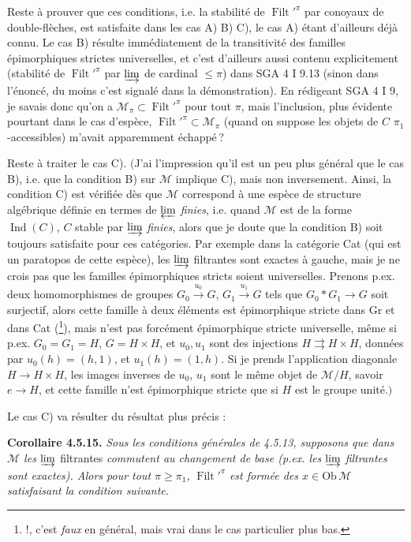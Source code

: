 \documentclass[11pt]{article}
\newcommand{\msp}[1]{\marginpar{\footnotesize [#1]}}
\newcommand{\Ob}{\mathrm{Ob}\,}
\newcommand{\Filt}{\operatorname{Filt}}
\newcommand{\Ind}{\operatorname{Ind}}
\begin{document}
Reste à prouver que ces conditions, i.e. la stabilité de $\Filt'^{\pi}$ par conoyaux de double-flèches, est satisfaite dans les cas A) B) C), le cas A) étant d'ailleurs déjà connu. Le cas B) résulte immédiatement de la transitivité des familles épimorphiques strictes universelles, et c'est d'ailleurs aussi contenu explicitement (stabilité de $\Filt'^{\pi}$ par $\varinjlim$ de cardinal $\leqslant \pi$) dans SGA 4 I 9.13 (sinon dans l'énoncé, du moins c'est signalé dans la démonstration). En rédigeant SGA 4 I 9, je savais donc qu'on a $\mathcal{M}_{\pi} \subset \Filt'^{\pi}$ pour tout $\pi$, mais l'inclusion, plus évidente pourtant dans le cas d'espèce, $\Filt'^{\pi} \subset \mathcal{M}_{\pi}$ (quand on suppose les objets de $C$ $\pi_1$-accessibles) m'avait apparemment échappé\,?

Reste à traiter le cas C). $\Big($J'ai l'impression qu'il est un peu plus général que le cas B), i.e. que la condition B) sur $\mathcal{M}$ implique C), mais non inversement. Ainsi, la condition C) est vérifiée dès que $\mathcal{M}$ correspond à une espèce de structure algébrique définie en
\msp{page 135}
termes de $\varprojlim$ \textit{finies}, i.e. quand $\mathcal{M}$ est de la forme $\Ind(C)$, $C$ stable par $\varinjlim$ \textit{finies}, alors que je doute que la condition B) soit toujours satisfaite pour ces catégories. Par exemple dans la catégorie Cat (qui est un paratopos de cette espèce), les $\varinjlim$ filtrantes sont exactes à gauche, mais je ne crois pas que les familles épimorphiques stricts soient universelles. %
Prenons p.ex. deux homomorphismes de groupes $G_0 \xrightarrow{u_0} G$, $G_1 \xrightarrow{u_1} G$ tels que $G_0 * G_1 \longrightarrow G$ soit surjectif, alors cette famille à deux éléments est épimorphique stricte dans Gr et dans Cat (\footnote{!, c'est \textit{faux} en général, mais vrai dans le cas particulier plus bas.}), mais n'est pas forcément épimorphique stricte universelle, même si p.ex. $G_0 = G_1 = H$, $G = H \times H$, et $u_0, u_1$ sont des injections $H \rightrightarrows H \times H$, données par $u_0(h) = (h,1)$, et $u_1(h) = (1,h)$. Si je prends l'application diagonale $H \longrightarrow H \times H$, les images inverses de $u_0$, $u_1$ sont le même objet de $\mathcal{M}/H$, savoir $e \longrightarrow H$, et cette famille n'est épimorphique stricte que si $H$ est le groupe unité.$\Big)$

Le cas C) va résulter du résultat plus précis :

\textbf{Corollaire 4.5.15.} \textit{Sous les conditions générales de 4.5.13, supposons que dans $\mathcal{M}$ les} $\varinjlim$
\msp{page 136}
filtrantes \textit{commutent au changement de base (p.ex. les} $\varinjlim$ \textit{filtrantes sont exactes). Alors pour tout $\pi \geqslant \pi_1$,} $\Filt'^{\pi}$ \textit{est formée des $x \in \Ob \mathcal{M}$ satisfaisant la condition suivante.}
\end{document}
